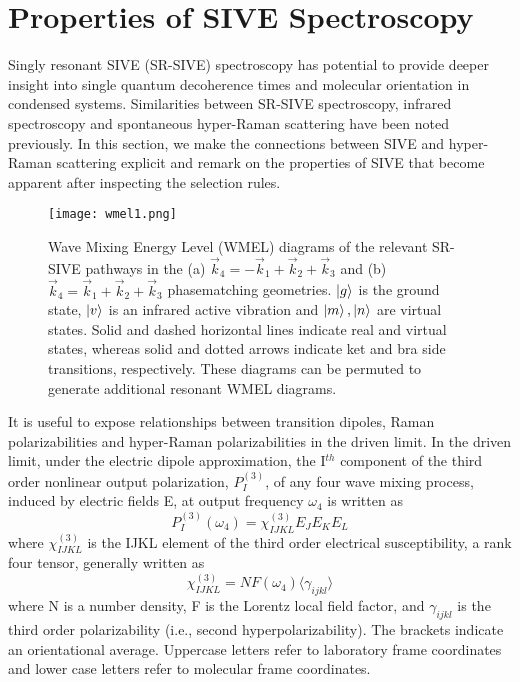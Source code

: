 \documentclass[aip, jcp, draft, onecolumn]{revtex4-2}
\begin{document}
\section{Properties of SIVE Spectroscopy}
Singly resonant SIVE (SR-SIVE) spectroscopy has potential to provide deeper insight into single quantum decoherence times and molecular orientation in condensed systems.
Similarities between SR-SIVE spectroscopy, infrared spectroscopy and spontaneous hyper-Raman scattering have been noted previously. \cite{RN352, Bonn2024}
In this section, we make the connections between SIVE and hyper-Raman scattering explicit and remark on the properties of SIVE that become apparent after inspecting the selection rules.

\begin{figure}[!htbp]
	\centering
	\texttt{[image: wmel1.png]}
	\caption{Wave Mixing Energy Level (WMEL) diagrams of the relevant SR-SIVE pathways in the (a) $\vec{k}_4 = -\vec{k}_1 + \vec{k}_2 + \vec{k}_3$ and (b) $\vec{k}_4 = \vec{k}_1 + \vec{k}_2 + \vec{k}_3$ phasematching geometries. \cite{RN286, RN352}
	$\ket{g}$ is the ground state, $\ket{v}$ is an infrared active vibration and $\ket{m}, \ket{n}$ are virtual states.
	Solid and dashed horizontal lines indicate real and virtual states, whereas solid and dotted arrows indicate ket and bra side transitions, respectively. 
	These diagrams can be permuted to generate additional resonant WMEL diagrams.}
	\label{fig:sivewmel}
\end{figure}

It is useful to expose relationships between transition dipoles, Raman polarizabilities and hyper-Raman polarizabilities in the driven limit. \cite{Simpson2004, RN120}
In the driven limit, under the electric dipole approximation, the I$^{th}$ component of the third order nonlinear output polarization, ${P}^{(3)}_I$, of any four wave mixing process, induced by electric fields E, at output frequency $\omega_4$ is written as \cite{RN307}
\begin{equation} \label{polarization}
{P}^{(3)}_I (\omega_4)  = \chi^{(3)}_{IJKL} E_J E_K E_L 
\end{equation}
where $\chi^{(3)}_{IJKL}$ is the IJKL element of the third order electrical susceptibility, a rank four tensor, generally written as
\begin{equation}
	\chi^{(3)}_{IJKL} = NF(\omega_4) \langle \gamma_{ijkl} \rangle
\end{equation}
where N is a number density, F is the Lorentz local field factor, and $\gamma_{ijkl}$ is the third order polarizability (i.e., second hyperpolarizability). 
The brackets indicate an orientational average. 
Uppercase letters refer to laboratory frame coordinates and lower case letters refer to molecular frame coordinates.
\end{document}
